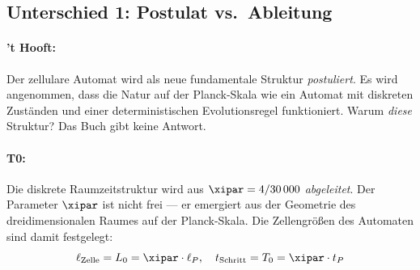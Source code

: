 \subsection{Unterschied 1: Postulat vs.\ Ableitung}

\paragraph{'t Hooft:} Der zellulare Automat wird als neue fundamentale Struktur
\emph{postuliert}. Es wird angenommen, dass die Natur auf der Planck-Skala wie ein
Automat mit diskreten Zuständen und einer deterministischen Evolutionsregel
funktioniert. Warum \emph{diese} Struktur? Das Buch gibt keine Antwort.

\paragraph{T0:} Die diskrete Raumzeitstruktur wird aus $\xipar = 4/30\,000$
\emph{abgeleitet}. Der Parameter $\xipar$ ist nicht frei — er emergiert aus
der Geometrie des dreidimensionalen Raumes auf der Planck-Skala. Die
Zellengrößen des Automaten sind damit festgelegt:
\begin{equation}
    \ell_{\text{Zelle}} = L_0 = \xipar \cdot \ell_P, \quad
    t_{\text{Schritt}} = T_0 = \xipar \cdot t_P
    \label{eq:cell_size}
\end{equation}

\begin{table}[h]
    \centering
    \caption{Postulat vs.\ Ableitung: Grundlegende Strukturen}
    \label{tab:postulate_vs_derivation}
\end{table}


